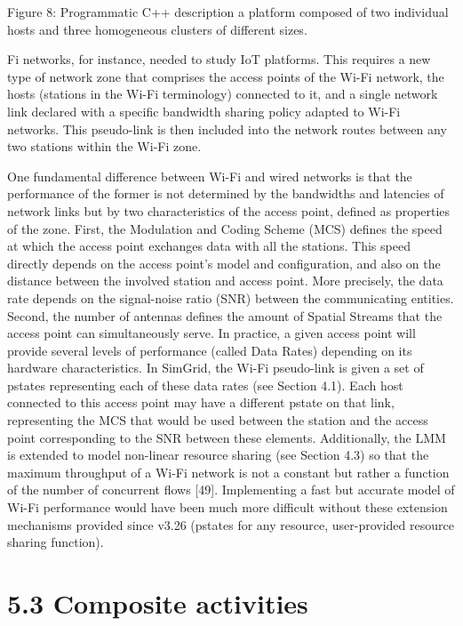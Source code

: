 \documentclass[
]{article}
\begin{document}
Figure 8: Programmatic C++ description a platform composed of two
individual hosts and three homogeneous clusters of different sizes.

Fi networks, for instance, needed to study IoT platforms. This requires
a new type of network zone that comprises the access points of the Wi-Fi
network, the hosts (stations in the Wi-Fi terminology) connected to it,
and a single network link declared with a specific bandwidth sharing
policy adapted to Wi-Fi networks. This pseudo-link is then included into
the network routes between any two stations within the Wi-Fi zone.

One fundamental difference between Wi-Fi and wired networks is that the
performance of the former is not determined by the bandwidths and
latencies of network links but by two characteristics of the access
point, defined as properties of the zone. First, the Modulation and
Coding Scheme (MCS) defines the speed at which the access point
exchanges data with all the stations. This speed directly depends on the
access point's model and configuration, and also on the distance between
the involved station and access point. More precisely, the data rate
depends on the signal-noise ratio (SNR) between the communicating
entities. Second, the number of antennas defines the amount of Spatial
Streams that the access point can simultaneously serve. In practice, a
given access point will provide several levels of performance (called
Data Rates) depending on its hardware characteristics. In SimGrid, the
Wi-Fi pseudo-link is given a set of pstates representing each of these
data rates (see Section 4.1). Each host connected to this access point
may have a different pstate on that link, representing the MCS that
would be used between the station and the access point corresponding to
the SNR between these elements. Additionally, the LMM is extended to
model non-linear resource sharing (see Section 4.3) so that the maximum
throughput of a Wi-Fi network is not a constant but rather a function of
the number of concurrent flows {[}49{]}. Implementing a fast but
accurate model of Wi-Fi performance would have been much more difficult
without these extension mechanisms provided since v3.26 (pstates for any
resource, user-provided resource sharing function).

\section{5.3 Composite activities}\label{composite-activities}
\end{document}
